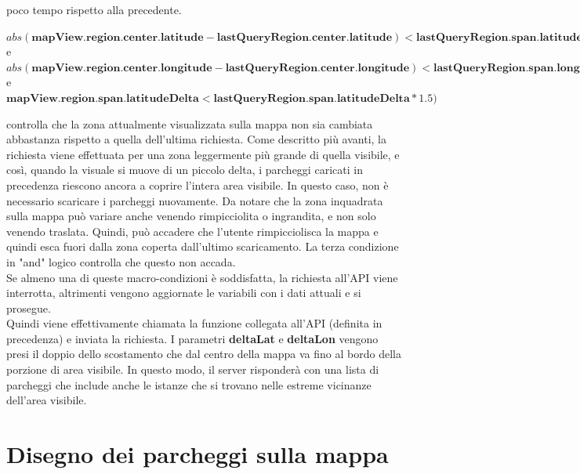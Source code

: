 poco tempo rispetto alla precedente.
\begin{center}
    $ abs(\textbf{mapView.region.center.latitude} - \textbf{lastQueryRegion.center.latitude}) < \textbf{lastQueryRegion.span.latitudeDelta}/2 $\\
    e\\
    $ abs(\textbf{mapView.region.center.longitude} - \textbf{lastQueryRegion.center.longitude}) < \textbf{lastQueryRegion.span.longitudeDelta}/2 $\\
    e\\
    $ \textbf{mapView.region.span.latitudeDelta} < \textbf{lastQueryRegion.span.latitudeDelta} * 1.5) $
\end{center} 
controlla che la zona attualmente visualizzata sulla mappa non sia cambiata abbastanza
rispetto a quella dell'ultima richiesta. Come descritto più avanti, la richiesta
viene effettuata per una zona leggermente più grande di quella visibile, e così, 
quando la visuale si muove di un piccolo delta, i parcheggi caricati in precedenza
riescono ancora a coprire l'intera area visibile. In questo caso, non è necessario
scaricare i parcheggi nuovamente. Da notare che la zona inquadrata sulla mappa può
variare anche venendo rimpicciolita o ingrandita, e non solo venendo traslata. Quindi,
può accadere che l'utente rimpicciolisca la mappa e quindi esca fuori dalla zona coperta
dall'ultimo scaricamento. La terza condizione in "and" logico controlla che questo
non accada.\\

Se almeno una di queste macro-condizioni è soddisfatta, la richiesta all'API viene 
interrotta, altrimenti vengono aggiornate le variabili con i dati attuali e si prosegue.\\
Quindi viene effettivamente chiamata la funzione collegata all'API (definita in precedenza)
e inviata la richiesta. I parametri \textbf{deltaLat} e \textbf{deltaLon} vengono presi 
il doppio dello scostamento che dal centro della mappa va fino al bordo della porzione
di area visibile. In questo modo, il server risponderà con una lista di parcheggi che 
include anche le istanze che si trovano nelle estreme vicinanze dell'area visibile.

\section{Disegno dei parcheggi sulla mappa} 

